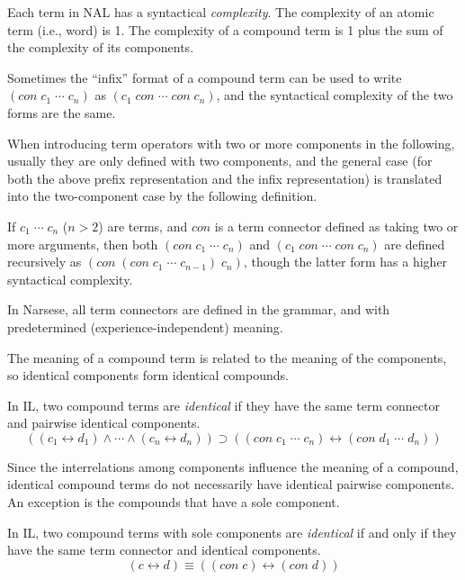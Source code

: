 \begin{defi}
Each term in NAL has a syntactical {\em complexity}.  The complexity of an atomic term (i.e., word) is 1. The complexity of a compound term is 1 plus the sum of the complexity of its components.
\end{defi}

Sometimes the ``infix'' format of a compound term can be used to write \((con \; c_1 \; \cdots \; c_n)\) as \((c_1 \; con \; \cdots \; con \; c_n)\), and the syntactical complexity of the two forms are the same.

When introducing term operators with two or more components in the following, usually they are only defined with two components, and the general case (for both the above prefix representation and the infix representation) is translated into the two-component case by the following definition.
\begin{defi}
If \(c_1 \; \cdots \; c_n\) ($n > 2$) are terms, and $con$ is a term connector defined as taking two or more arguments, then both \((con \; c_1 \; \cdots \; c_n)\) and \((c_1 \; con \; \cdots \; con \; c_n)\) are defined recursively as \((con \; (con \; c_1 \; \cdots \; c_{n-1}) \; c_n)\), though the latter form has a higher syntactical complexity.  
\end{defi}

In Narsese, all term connectors are defined in the grammar, and with predetermined (experience-independent) meaning. 

The meaning of a compound term is related to the meaning of the components, so identical components form identical compounds.
\begin{defi}
In IL, two compound terms are \emph{identical} if they have the same term connector and pairwise identical components. \[((c_1 \leftrightarrow d_1) \wedge \cdots \wedge (c_n \leftrightarrow d_n)) \supset ((con \; c_1 \; \cdots \; c_n) \leftrightarrow (con \; d_1 \; \cdots \; d_n))\]
\end{defi}

Since the interrelations among components influence the meaning of a compound, identical compound terms do not necessarily have identical pairwise components. An exception is the compounds that have a sole component.
\begin{defi}
In IL, two compound terms with sole components are \emph{identical} if and only if they have the same term connector and identical components.\[(c \leftrightarrow d) \equiv ((con \; c) \leftrightarrow (con \; d))\] 
\end{defi}

